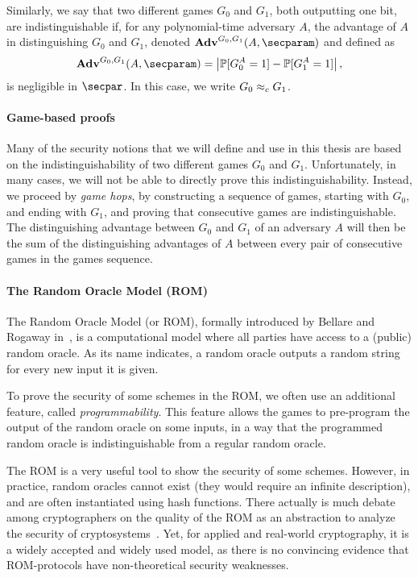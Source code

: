 Similarly, we say that two different games $G_0$ and $G_1$, both outputting one bit, are indistinguishable if, for any polynomial-time adversary $A$, the advantage of $A$ in distinguishing $G_0$ and $G_1$, denoted $\Adv^{G_0, G_1}(A,\secparam)$ and defined as
\[
	\Adv^{G_0, G_1}(A,\secparam) = \left| \Prob[G_0^A = 1] - \Prob[G_1^A = 1] \right|,
\]
is negligible in $\secpar$.
In this case, we write $G_0 \approx_c G_1$.

\paragraph{Game-based proofs} %
\label{par:def_game_based_proofs}

Many of the security notions that we will define and use in this thesis are based on the indistinguishability of two different games $G_0$ and $G_1$.
Unfortunately, in many cases, we will not be able to directly prove this indistinguishability.
Instead, we proceed by \emph{game hops}, by constructing a sequence of games, starting with $G_0$, and ending with $G_1$, and proving that consecutive games are indistinguishable.
The distinguishing advantage between $G_0$ and $G_1$ of an adversary $A$ will then be the sum of the distinguishing advantages of $A$ between every pair of consecutive games in the games sequence. 



\paragraph{The Random Oracle Model (ROM)} %
\label{par:def_rom}

The Random Oracle Model (or ROM), formally introduced by Bellare and Rogaway in~\cite{CCS:BelRog93}, is a computational model where all parties have access to a (public) random oracle.
As its name indicates, a random oracle outputs a random string for every new input it is given.

To prove the security of some schemes in the ROM, we often use an additional feature, called \emph{programmability}.
This feature allows the games to pre-program the output of the random oracle on some inputs, in a way that the programmed random oracle is indistinguishable from a regular random oracle. 

The ROM is a very useful tool to show the security of some schemes.
However, in practice, random oracles cannot exist (they would require an infinite description), and are often instantiated using hash functions.
There actually is much debate among cryptographers on the quality of the ROM as an abstraction to analyze the security of cryptosystems~\cite{EPRINT:KobMen15}.
Yet, for applied and real-world cryptography, it is a widely accepted and widely used model, as there is no convincing evidence that ROM-protocols have non-theoretical security weaknesses.

